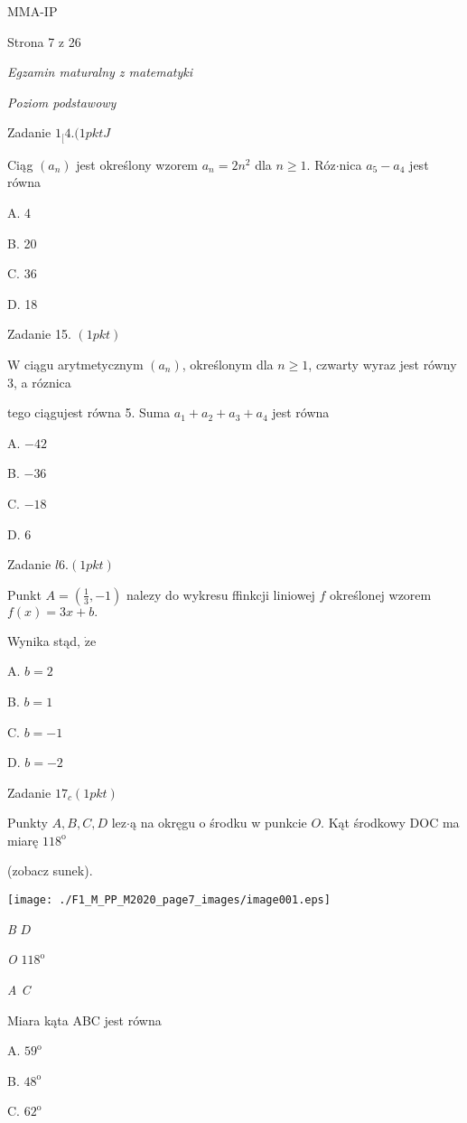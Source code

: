 \documentclass[a4paper,12pt]{article}
\begin{document}
MMA-IP

Strona 7 z 26





{\it Egzamin maturalny z matematyki}

{\it Poziom podstawowy}

Zadanie $1_{[}4. (1pktJ$

Ciąg $(a_{n})$ jest określony wzorem $a_{n}=2n^{2}$ dla $n\geq 1$. Róz$\cdot$nica $a_{5}-a_{4}$ jest równa

A. 4

B. 20

C. 36

D. 18

Zadanie 15. $(1pkt)$

$\mathrm{W}$ ciągu arytmetycznym $(a_{n})$, określonym dla $n\geq 1$, czwarty wyraz jest równy 3, a róznica

tego ciągujest równa 5. Suma $a_{1}+a_{2}+a_{3}+a_{4}$ jest równa

A. $-42$

B. $-36$

C. $-18$

D. 6

Zadanie $l6. (1pkt)$

Punkt $A=(\displaystyle \frac{1}{3},-1)$ nalezy do wykresu ffinkcji liniowej $f$ określonej wzorem $f(x)=3x+b.$

Wynika stąd, $\dot{\mathrm{z}}\mathrm{e}$

A. $b=2$

B. $b=1$

C. $b=-1$

D. $b=-2$

Zadanie $17_{c}(1pkt)$

Punkty $A, B, C, D$ lez$\cdot$ą na okręgu o środku w punkcie $O$. Kąt środkowy DOC ma miarę $118^{\mathrm{o}}$

(zobacz sunek).
\begin{center}
\texttt{[image: ./F1\_M\_PP\_M2020\_page7\_images/image001.eps]}
\end{center}
{\it B} $D$

{\it O}  $118^{\mathrm{o}}$

{\it A C}

Miara kąta ABC jest równa

A. $59^{\mathrm{o}}$

B. $48^{\mathrm{o}}$

C. $62^{\mathrm{o}}$
\end{document}
